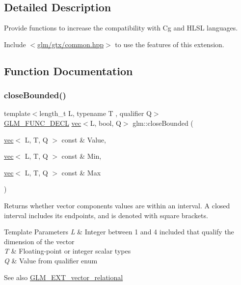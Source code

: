 \subsection{Detailed Description}
Provide functions to increase the compatibility with Cg and H\+L\+SL languages. 

Include $<$\mbox{\hyperlink{gtx_2common_8hpp}{glm/gtx/common.\+hpp}}$>$ to use the features of this extension. 

\subsection{Function Documentation}
\mbox{\label{group__gtx__common_gab7d89c14c48ad01f720fb5daf8813161}} 
\subsubsection{\texorpdfstring{close\+Bounded()}{closeBounded()}}
{\footnotesize\ttfamily template$<$length\+\_\+t L, typename T , qualifier Q$>$ \\
\mbox{\hyperlink{setup_8hpp_ab2d052de21a70539923e9bcbf6e83a51}{G\+L\+M\+\_\+\+F\+U\+N\+C\+\_\+\+D\+E\+CL}} \mbox{\hyperlink{structglm_1_1vec}{vec}}$<$L, bool, Q$>$ glm\+::close\+Bounded (\begin{DoxyParamCaption}\item[{\mbox{\hyperlink{structglm_1_1vec}{vec}}$<$ L, T, Q $>$ const \&}]{Value,  }\item[{\mbox{\hyperlink{structglm_1_1vec}{vec}}$<$ L, T, Q $>$ const \&}]{Min,  }\item[{\mbox{\hyperlink{structglm_1_1vec}{vec}}$<$ L, T, Q $>$ const \&}]{Max }\end{DoxyParamCaption})}

Returns whether vector components values are within an interval. A closed interval includes its endpoints, and is denoted with square brackets.


\begin{DoxyTemplParams}{Template Parameters}
{\em L} & Integer between 1 and 4 included that qualify the dimension of the vector \\
\hline
{\em T} & Floating-\/point or integer scalar types \\
\hline
{\em Q} & Value from qualifier enum\\
\hline
\end{DoxyTemplParams}
\begin{DoxySeeAlso}{See also}
\mbox{\hyperlink{group__ext__vector__relational}{G\+L\+M\+\_\+\+E\+X\+T\+\_\+vector\+\_\+relational}} 
\end{DoxySeeAlso}
\mbox{\label{group__gtx__common_gae5e80425df9833164ad469e83b475fb4}} 
